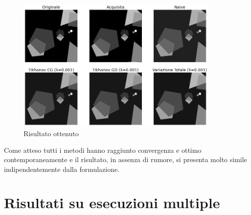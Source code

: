 \documentclass[11pt]{article}
\begin{document}
\begin{figure}[H]
    \centering
    \includegraphics[width=10cm]{semiconvergenza/3/deblur_all.png}
    \caption{Risultato ottenuto}
    \label{fig:semiconv_deblur3}
\end{figure}
Come atteso tutti i metodi hanno raggiunto convergenza e ottimo contemporaneamente e il risultato, in assenza di rumore, si presenta molto simile indipendentemente dalla formulazione.

\section{Risultati su esecuzioni multiple}
\end{document}
